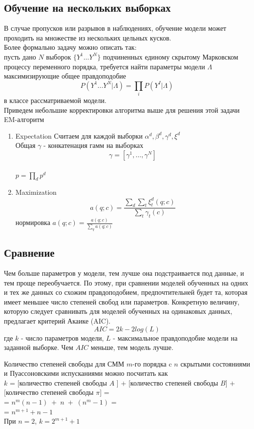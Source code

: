 \documentclass{matmex-diploma-custom}
\begin{document}
\subsection{Обучение на нескольких выборках}
В случае пропусков или разрывов в наблюдениях, обучение модели может проходить на множестве из нескольких цельных кусков.
\\
Более формально задачу можно описать так: 
\\
пусть дано $ N $ выборок $ \{Y^{1} \ldots Y^{N}\}$ подчиненных единому скрытому Марковском процессу переменного порядка, требуется найти параметры модели $\Lambda$ максимизирующие общее правдоподобие 
$$P(Y^{1} ... Y^{N}| \Lambda) = \prod_{i}{P(Y^{I}|\Lambda)}$$
в классе рассматриваемой модели.
\\
Приведем небольшие корректировки алгоритма выше для решения этой задачи
\\
EM-алгоритм
\begin{enumerate}
\item Expectation
Считаем для каждой выборки  $\alpha^{d}, \beta^{d}, \gamma^{d}, \xi^{d}$
\\
Общая $\gamma$ - конкатенация гамм на выборках
$$ \gamma = [\gamma^{1}, \ldots ,\gamma^{N}] $$
\\
$ p = \prod_{d}{p^{d}}$
\item Maximization
$$ a(q;c) = \frac{\sum_{d}{\sum_{t}{\xi^{d}_{t}(q;c)}}}{\sum_{t}{\gamma_{t}(c)}} $$
нормировка
$ a(q;c) = \frac{a(q;c)}{\sum_{q}{a(q;c)}} $
\end{enumerate}

\subsection{Сравнение}
Чем больше параметров у модели, тем лучше она подстраивается под данные, и тем проще переобучается. 
По этому, при сравнении моделей обученных на одних и тех же данных со схожим правдоподобием, предпочтительней будет та, которая имеет меньшее число степеней свобод или параметров. 
Конкретную величину, которую следует сравнивать для моделей обученных на одинаковых данных, предлагает критерий Акаике (AIC).
$$ AIC = 2k-2log(L) $$ 
где $ k $ - число параметров модели, $ L $ - максимальное правдоподобие модели на заданной выборке. Чем $AIC$ меньше, тем модель лучше. 

Количество степеней свободы для СММ $ m $-го порядка c $ n $ скрытыми состояниями и Пуассоновскими испусканиями можно посчитать как
\\
$k$ = [количество степеней свободы $ A$ ]
$+$ [количество степеней свободы $ B $] $+$ [количество степеней свободы $ \pi $] =
\\= $n^m(n-1)\;+\;n\;+\;(n^m-1)$ = 
\\= $n^{m+1} + n - 1$
\\
При $n=2$, $k=2^{m+1} + 1$ 
\end{document}
